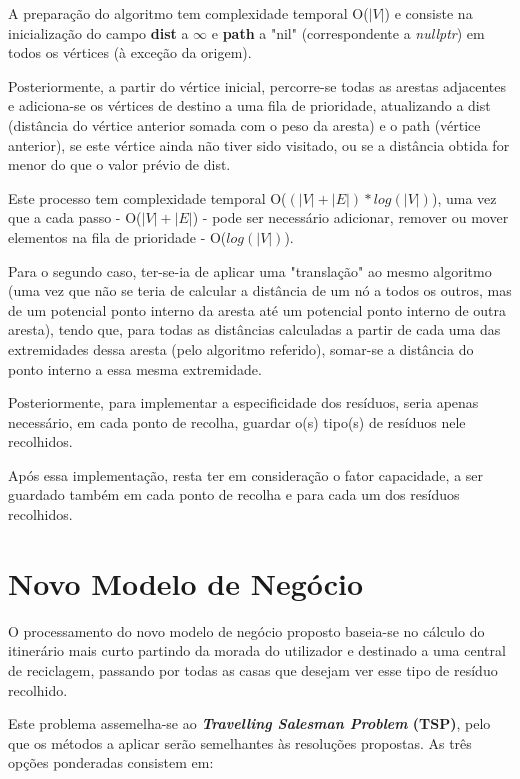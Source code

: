 \documentclass[article, a4paper, 12pt, oneside]{memoir}
\begin{document}
A preparação do algoritmo tem complexidade temporal O($|V|$) e consiste na inicialização do campo \textbf{dist} a $\infty$ e \textbf{path} a "nil" (correspondente a \textit{nullptr}) em todos os vértices (à exceção da origem).

Posteriormente, a partir do vértice inicial, percorre-se todas as arestas adjacentes e adiciona-se os vértices de destino a uma fila de prioridade, atualizando a dist (distância do vértice anterior somada com o peso da aresta) e o path (vértice anterior), se este vértice ainda não tiver sido visitado, ou se a distância obtida for menor do que o valor prévio de dist.

Este processo tem complexidade temporal O($(|V| + |E|)*log(|V|)$), uma vez que a cada passo - O($|V| + |E|$) - pode ser necessário adicionar, remover ou mover elementos na fila de prioridade - O($log(|V|)$).
	
Para o segundo caso, ter-se-ia de aplicar uma "translação" ao mesmo algoritmo (uma vez que não se teria de calcular a distância de um nó a todos os outros, mas de um potencial ponto interno da aresta até um potencial ponto interno de outra aresta), tendo que, para todas as distâncias calculadas a partir de cada uma das extremidades dessa aresta (pelo algoritmo referido), somar-se a distância do ponto interno a essa mesma extremidade.

Posteriormente, para implementar a especificidade dos resíduos, seria apenas necessário, em cada ponto de recolha, guardar o(s) tipo(s) de resíduos nele recolhidos.

Após essa implementação, resta ter em consideração o fator capacidade, a ser guardado também em cada ponto de recolha e para cada um dos resíduos recolhidos.

\section{Novo Modelo de Negócio}

O processamento do novo modelo de negócio proposto baseia-se no cálculo do itinerário mais curto partindo da morada do utilizador e destinado a uma central de reciclagem, passando por todas as casas que desejam ver esse tipo de resíduo recolhido.

Este problema assemelha-se ao \textbf{\textit{Travelling Salesman Problem} (TSP)}, pelo que os métodos a aplicar serão semelhantes às resoluções propostas. As três opções ponderadas consistem em:
\end{document}

